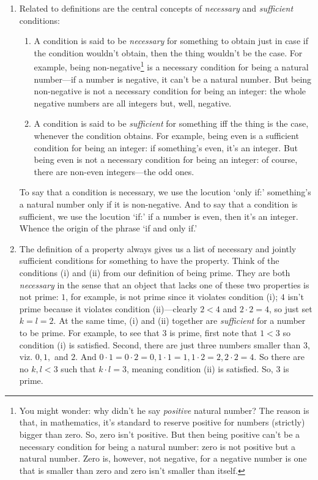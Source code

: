 \begin{enumerate}[{\thesection}.1]
		\item Related to definitions are the central concepts of \emph{necessary} and \emph{sufficient} conditions:
		
			\begin{enumerate}[\thesection.{20}.a]
		
			\item  A condition is said to be \emph{necessary} for something to obtain just in case if the condition wouldn't obtain, then the thing wouldn't be the case. For example, being non-negative\footnote{You might wonder: why didn't he say \emph{positive} natural number? The reason is that, in mathematics, it's standard to reserve positive for numbers (strictly) bigger than zero. So, zero isn't positive. But then being positive can't be a necessary condition for being a natural number: zero is not positive but a natural number. Zero is, however, not negative, for a negative number is one that is smaller than zero and zero isn't smaller than itself.} is a necessary condition for being a natural number---if a number is negative, it can't be a natural number. But being non-negative is not a necessary condition for being an integer: the whole negative numbers are all integers but, well, negative.
						
			\item A condition is said to be \emph{sufficient} for something iff the thing is the case, whenever the condition obtains. For example, being even is a sufficient condition for being an integer: if something's even, it's an integer. But being even is not a necessary condition for being an integer: of course, there are non-even integers---the odd ones.		
			
			\end{enumerate}
		
	To say that a condition is necessary, we use the locution `only if:' something's a natural number only if it is non-negative. And to say that a condition is sufficient, we use the locution `if:' if a number is even, then it's an integer. Whence the origin of the phrase `if and only if.'
		
	\item The definition of a property always gives us a list of necessary and jointly sufficient conditions for something to have the property. Think of the conditions (i) and (ii) from our definition of being prime. They are both \emph{necessary} in the sense that an object that lacks one of these two properties is not prime: $1$, for example, is not prime since it violates condition (i); $4$ isn't prime because it violates condition (ii)---clearly $2<4$ and $2\cdot 2=4$, so just set $k=l=2$. At the same time, (i) and (ii) together are \emph{sufficient} for a number to be prime. For example, to see that $3$ is prime, first note that $1<3$ so condition (i) is satisfied. Second, there are just three numbers smaller than 3, viz. $0,1,$ and $2$. And $0\cdot 1=0\cdot 2= 0, 1\cdot 1=1, 1\cdot 2=2, 2\cdot 2=4$. So there are no $k,l<3$ such that $k\cdot l=3$, meaning condition (ii) is satisfied. So, $3$ is prime.
	

\end{enumerate}
